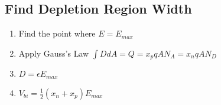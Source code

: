 \documentclass{article}
\begin{document}
   \subsection{Find Depletion Region Width}
   \begin{enumerate}
     \item Find the point where $E = E_{max}$
     \item Apply Gauss's Law $\int DdA = Q = x_pqAN_A = x_nqAN_D$
     \item $D = \epsilon E_{max}$
     \item $V_{bi} = \frac{1}{2}(x_n + x_p)E_{max}$
   \end{enumerate}
\end{document}
